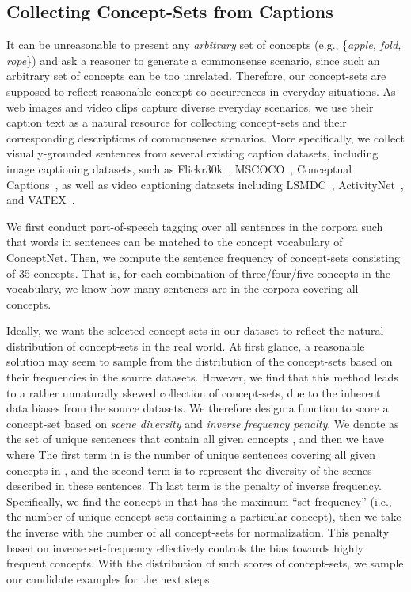 \documentclass[11pt,a4paper]{article}
\begin{document}
	\subsection{Collecting Concept-Sets from Captions}
	\label{ssec:conceptset}
It can be unreasonable to present any \emph{arbitrary} set of concepts (e.g., \{\textit{apple, fold, rope}\}) and ask a reasoner to generate a commonsense scenario, since such an arbitrary set of concepts can be too unrelated. Therefore, our concept-sets are supposed to reflect reasonable concept co-occurrences in everyday situations.
As web images and video clips capture diverse everyday scenarios, 
    we use their caption text as a natural resource for collecting concept-sets and their corresponding descriptions of commonsense scenarios.
More specifically, we collect visually-grounded sentences from several existing caption datasets, including {image captioning} datasets, such as  {Flickr30k}~\cite{young-etal-2014-image}, {MSCOCO}~\cite{Lin2014MicrosoftCC}, {Conceptual Captions}~\cite{Sharma2018ConceptualCA}, as well as {video captioning} datasets including {LSMDC}~\cite{lsmdc}, {ActivityNet}~\cite{krishna2017dense}, and {VATEX}~\cite{Wang_2019_ICCV}.
	
We first conduct part-of-speech tagging over all sentences in the corpora such that words in sentences can be matched to the concept vocabulary of ConceptNet.
	Then, we compute the sentence frequency of 
	concept-sets consisting of  35 concepts.
	That is, for each combination of three/four/five concepts in the vocabulary, we know how many sentences are in the corpora covering all concepts.
	
Ideally, we want the selected concept-sets in our dataset to reflect the natural distribution of concept-sets in the real world. 
At first glance, a reasonable solution may seem to sample from the distribution of the concept-sets based on their frequencies in the source datasets. 
However, we find that this method leads to a rather unnaturally skewed collection of concept-sets, due to the inherent data biases from the source datasets.   
We therefore design a function to score a concept-set  based on  \textit{scene diversity} and  \textit{inverse frequency penalty}.
	We denote  as the set of unique sentences that contain all given concepts , and then we have  
	{{}}where 
	The first term in  is the number of unique sentences covering all given concepts in , and
	the second term is to represent the diversity of the scenes described in these sentences.
	Th last term  is the penalty of inverse frequency.
	Specifically, we find the concept in  that has the maximum ``set frequency'' (i.e., the number of unique concept-sets containing a particular concept), then we take the inverse with the number of all concept-sets for normalization. 
	This penalty based on inverse set-frequency effectively controls the bias towards highly frequent concepts.
	With the distribution of such scores of concept-sets, we sample our candidate examples for the next steps.
\end{document}
